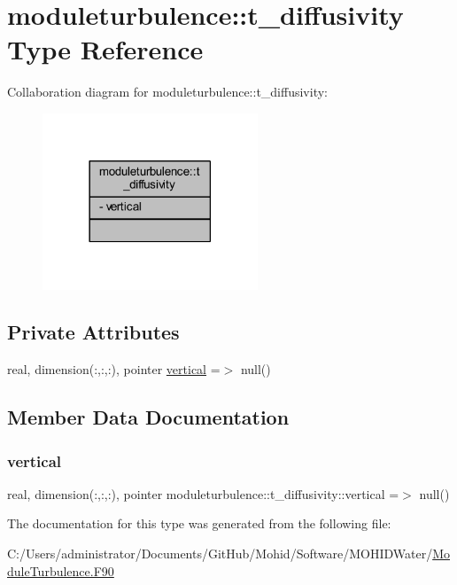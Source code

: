 \hypertarget{structmoduleturbulence_1_1t__diffusivity}{}\section{moduleturbulence\+:\+:t\+\_\+diffusivity Type Reference}
\label{structmoduleturbulence_1_1t__diffusivity}


Collaboration diagram for moduleturbulence\+:\+:t\+\_\+diffusivity\+:\nopagebreak
\begin{figure}[H]
\begin{center}
\leavevmode
\includegraphics[width=182pt]{structmoduleturbulence_1_1t__diffusivity__coll__graph}
\end{center}
\end{figure}
\subsection*{Private Attributes}
\begin{DoxyCompactItemize}
\item 
real, dimension(\+:,\+:,\+:), pointer \mbox{\hyperlink{structmoduleturbulence_1_1t__diffusivity_a8cc28b4b21166044cc7cb4534e28ce47}{vertical}} =$>$ null()
\end{DoxyCompactItemize}


\subsection{Member Data Documentation}
\mbox{\label{structmoduleturbulence_1_1t__diffusivity_a8cc28b4b21166044cc7cb4534e28ce47}} 
\subsubsection{\texorpdfstring{vertical}{vertical}}
{\footnotesize\ttfamily real, dimension(\+:,\+:,\+:), pointer moduleturbulence\+::t\+\_\+diffusivity\+::vertical =$>$ null()\hspace{0.3cm}{\ttfamily [private]}}



The documentation for this type was generated from the following file\+:\begin{DoxyCompactItemize}
\item 
C\+:/\+Users/administrator/\+Documents/\+Git\+Hub/\+Mohid/\+Software/\+M\+O\+H\+I\+D\+Water/\mbox{\hyperlink{_module_turbulence_8_f90}{Module\+Turbulence.\+F90}}\end{DoxyCompactItemize}

